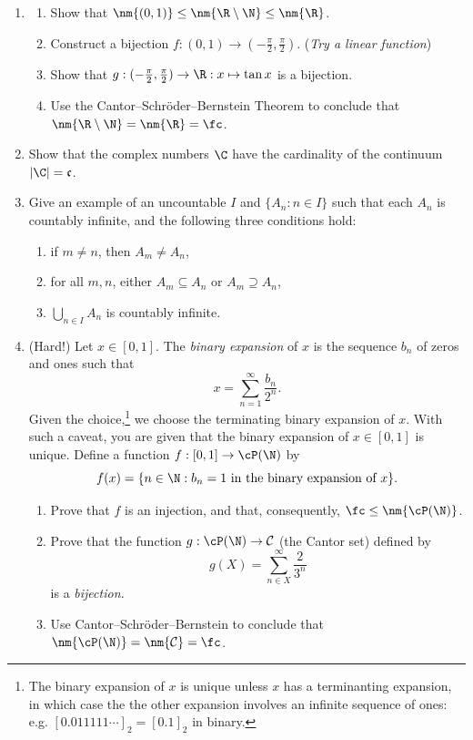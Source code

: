 \begin{enumerate}
	\item\begin{enumerate}
  		\item Show that $\nm{(0,1)}\le\nm{\R\setminus\N}\le\nm{\R}$.
  		\item Construct a bijection $f:(0,1)\to (-\frac\pi 2,\frac\pi 2)$. (\emph{Try a linear function})
  		\item Show that $g:(-\frac\pi 2,\frac\pi 2)\to\R:x\mapsto\tan x$ is a bijection.
  		\item Use the Cantor--Schr\"oder--Bernstein Theorem to conclude that $\nm{\R\setminus\N}=\nm{\R}=\fc$.
  	\end{enumerate}
  	
  	\item Show that the complex numbers $\C$ have the cardinality of the continuum $|\C| = \mathfrak{c}$.
  	
  	\item Give an example of an uncountable $I$ and $\{A_n : n \in I\}$ such that each $A_n$ is countably infinite, and the following three conditions hold:
\begin{enumerate}[label=(\roman*)]
    \item if $m \neq n$, then $A_m \neq A_n$,
    \item for all $m,n$, either $A_m \subseteq A_n$ or $A_m \supseteq A_n$,
    \item $\bigcup_{n \in I} A_n$ is countably infinite.
\end{enumerate}
  	
  		
	\item (Hard!) Let $x\in[0,1]$. The \emph{binary expansion} of $x$ is the sequence $b_n$ of zeros and ones such that
  \[x=\sum_{n=1}^\infty \frac{b_n}{2^n}.\]
  Given the choice,\footnote{The binary expansion of $x$ is unique unless $x$ has a terminanting expansion, in which case the the other expansion involves an infinite sequence of ones: e.g. $[0.011111\cdots]_2=[0.1]_2$ in binary.} we choose the terminating binary expansion of $x$. With such a caveat, you are given that the binary expansion of $x\in[0,1]$ is unique. Define a function $f:[0,1]\to\cP(\N)$ by
  \[f(x)=\{n\in\N:b_n=1\text{ in the binary expansion of $x$}\}.\]
  \begin{enumerate}
    \item Prove that $f$ is an injection, and that, consequently, $\fc\le\nm{\cP(\N)}$.
		\item Prove that the function $g:\cP(\N)\to\mathcal C$ (the Cantor set) defined by
		\[g(X)=\sum\limits_{n\in X}^\infty\frac{2}{3^n}\]
		is a \emph{bijection.}
		\item Use Cantor--Schr\"oder--Bernstein to conclude that $\nm{\cP(\N)}=\nm{\mathcal C}=\fc$.
	\end{enumerate}
	

\end{enumerate}
